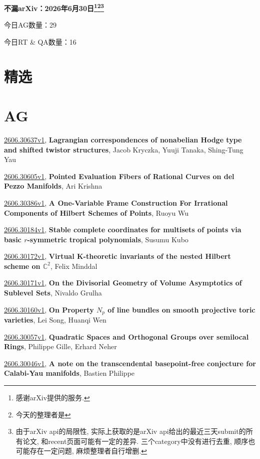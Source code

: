 \documentclass[9pt, a4paper]{article}
\theoremstyle{plain}
\theoremstyle{definition}
\theoremstyle{remark}
\newcommand{\arxiv}[3]{\href{https://arxiv.org/abs/#1}{#1}, \textbf{\textcolor{arxivblue}{#2}}, #3}
\newcommand{\AGnumber}{29}
\newcommand{\RTQAnumber}{16}
\newcommand{\NewestDate}{2026年6月30日}
\newcommand{\todayarXiver}{} %
\begin{document}
\begin{center}
    \Huge\textbf{不漏arXiv：\NewestDate\footnote{感谢arXiv提供的服务.}\footnote{今天的整理者是\todayarXiver}\footnote{由于arXiv api的局限性, 实际上获取的是arXiv api给出的最近三天submit的所有论文, 和recent页面可能有一定的差异. 三个category中没有进行去重, 顺序也可能存在一定问题, 麻烦整理者自行增删.}} \\
\end{center}

\setcounter{section}{-1}

\begin{center}
    今日AG数量：\AGnumber
    
    今日RT \& QA数量：\RTQAnumber
    
\end{center}


\section{精选}


\section{AG}
\arxiv{2606.30637v1}{Lagrangian correspondences of nonabelian Hodge type and shifted twistor structures}{Jacob Kryczka, Yuuji Tanaka, Shing-Tung Yau}

\arxiv{2606.30605v1}{Pointed Evaluation Fibers of Rational Curves on del Pezzo Manifolds}{Ari Krishna}

\arxiv{2606.30386v1}{A One-Variable Frame Construction For Irrational Components of Hilbert Schemes of Points}{Ruoyu Wu}

\arxiv{2606.30184v1}{Stable complete coordinates for multisets of points via basic $r$-symmetric tropical polynomials}{Susumu Kubo}

\arxiv{2606.30172v1}{Virtual K-theoretic invariants of the nested Hilbert scheme on $\mathbb{C}^2$}{Felix Minddal}

\arxiv{2606.30171v1}{On the Divisorial Geometry of Volume Asymptotics of Sublevel Sets}{Nivaldo Grulha}

\arxiv{2606.30160v1}{On Property $N_p$ of line bundles on smooth projective toric varieties}{Lei Song, Huanqi Wen}

\arxiv{2606.30057v1}{Quadratic Spaces and Orthogonal Groups over semilocal Rings}{Philippe Gille, Erhard Neher}

\arxiv{2606.30046v1}{A note on the transcendental basepoint-free conjecture for Calabi-Yau manifolds}{Bastien Philippe}
\end{document}

